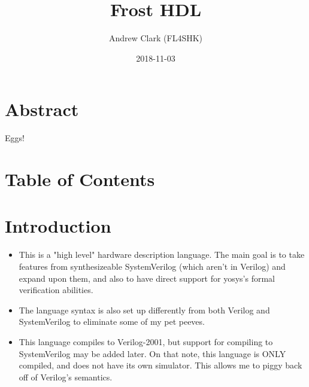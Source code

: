 \documentclass{article}
\title{Frost HDL}
\date{2018-11-03}
\author{Andrew Clark (FL4SHK)}
\makeatletter
\renewcommand\tableofcontents{%
    \@starttoc{toc}%
}
\makeatother
\begin{document}
	\maketitle
	\newpage

	\doublespacing
	\section{Abstract}
	\setcounter{section}{-1}
	Eggs!

	\newpage
	\section{Table of Contents}
	\tableofcontents
	\newpage

	\section{Introduction}
		\begin{itemize}
		\item This is a "high level" hardware description language.  The
		main goal is to take features from synthesizeable SystemVerilog
		(which aren't in Verilog) and expand upon them, and also to have
		direct support for yosys's formal verification abilities.
		\item The language syntax is also set up differently from both
		Verilog and SystemVerilog to eliminate some of my pet peeves.
		\item This language compiles to Verilog-2001, but support for
		compiling to SystemVerilog may be added later.  On that note, this
		language is ONLY compiled, and does not have its own simulator.
		This allows me to piggy back off of Verilog's semantics.
		\end{itemize}
\end{document}
